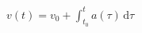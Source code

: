 \documentclass[border=2.5pt]{standalone}
\begin{document}
$\displaystyle v(t)=v_0+\int_{t_0}^t a(\tau)\,\mathrm d\tau$
\end{document}
